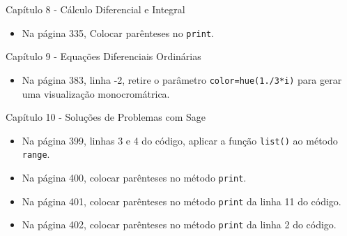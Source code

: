 \documentclass[10pt,a4paper]{report}
\begin{document}
\vspace{0.5cm}
\noindent
{\large Capítulo 8 - Cálculo Diferencial e Integral}


\begin{itemize}
 \item Na página 335, Colocar parênteses no \verb|print|.
\end{itemize}


\vspace{0.5cm}
\noindent
{\large Capítulo 9 - Equações Diferenciais Ordinárias}


\begin{itemize}



\item Na página 383, linha -2, retire o parâmetro \verb|color=hue(1./3*i)| para gerar uma visualização monocromátrica.

\end{itemize}


\vspace{0.5cm}
\noindent
{\large Capítulo 10 - Soluções de Problemas com Sage}


\begin{itemize}
 \item Na página 399, linhas 3 e 4 do código, aplicar a função \verb|list()| ao método \verb|range|.
 \item Na página 400, colocar parênteses no método \verb|print|. 
 \item Na página 401, colocar parênteses no método \verb|print| da linha 11 do código. 
 \item Na página 402, colocar parênteses no método \verb|print| da linha 2 do código. 
\end{itemize}



% 
% 
\end{document}
